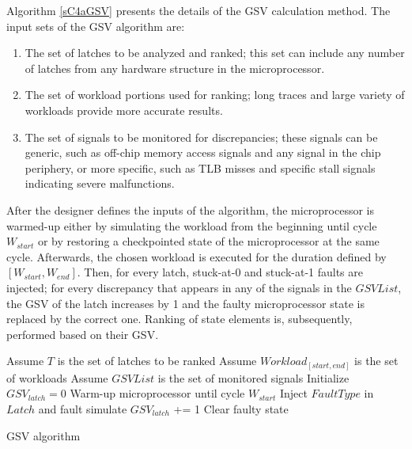 \documentclass[12pt]{yalephd}
\begin{document}
Algorithm \ref{sC4aGSV} presents the details of the GSV calculation method. The input sets of the GSV algorithm are:
\begin{enumerate}
\item The set of latches to be analyzed and ranked; this set can include any number of latches from any hardware structure in the microprocessor.
\item The set of workload portions used for ranking; long traces and large variety of workloads provide more accurate results.
\item The set of signals to be monitored for discrepancies; these signals can be generic, such as off-chip memory access signals and any signal in the chip periphery, or more specific, such as TLB misses and specific stall signals indicating severe malfunctions.
\end{enumerate}

After the designer defines the inputs of the algorithm, the microprocessor is warmed-up either by simulating the workload from the beginning until cycle $W_{start}$ or by restoring a checkpointed state of the microprocessor at the same cycle. Afterwards, the chosen workload is executed for the duration defined by $[W_{start}, W_{end}]$. Then, for every latch, stuck-at-0 and stuck-at-1 faults are injected; for every discrepancy that appears in any of the signals in the $GSVList$, the GSV of the latch increases by 1 and the faulty microprocessor state is replaced by the correct one. Ranking of state elements is, subsequently, performed based on their GSV.

\begin{algorithm}[!ht]

Assume $T$ is the set of latches to be ranked\;
Assume $Workload_{[start,end]}$ is the set of workloads\;
Assume $GSVList$ is the set of monitored signals\;
 {
    Initialize $GSV_{latch} = 0$ \;
}
 {
    Warm-up microprocessor until cycle $W_{start}$ \;
     {
         {
             {
                Inject $FaultType$ in $Latch$ and fault simulate\;
                 {
                    $GSV_{latch}$ += 1\;
                    Clear faulty state\;
                }
            }
        }
    }
}

\caption{GSV algorithm}
\label{sC4aGSV}
\end{algorithm}
\end{document}
